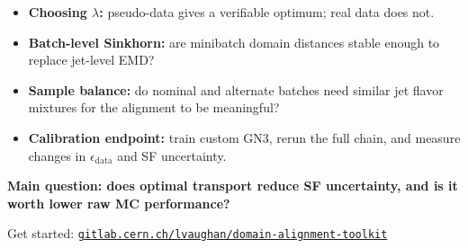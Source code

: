 \begin{frame}[plain]

  \vspace{13mm}
  {\small
  \begin{itemize}\tightlist
    \item \textbf{Choosing $\lambda$:} pseudo-data gives a verifiable optimum; real data does not.
    \item \textbf{Batch-level Sinkhorn:} are minibatch domain distances stable enough to replace jet-level EMD?
    \item \textbf{Sample balance:} do nominal and alternate batches need similar jet flavor mixtures for the alignment to be meaningful?
    \item \textbf{Calibration endpoint:} train custom GN3, rerun the full chain, and measure changes in $\epsilon_{\mathrm{data}}$ and SF uncertainty.
  \end{itemize}}

  \vspace{6mm}
  \begin{center}
    {\large\color{argonneBlue}\textbf{Main question: does optimal transport reduce SF uncertainty, and is it worth lower raw MC performance?}}

    \vspace{4mm}
    {\scriptsize Get started: \href{https://gitlab.cern.ch/lvaughan/domain-alignment-toolkit}{\texttt{gitlab.cern.ch/lvaughan/domain-alignment-toolkit}}}
  \end{center}

  \slideheaderfooter
\end{frame}
